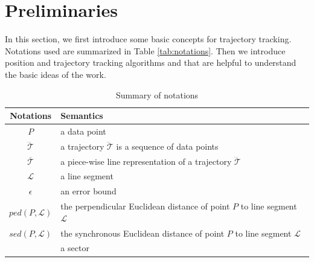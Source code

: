 



\section{Preliminaries}
\label{sec-pre}

In this section, we first introduce some basic concepts for trajectory tracking.
Notations used are summarized in Table \ref{tab:notations}.
Then we introduce position and trajectory tracking algorithms \ldr and \ldrh that are helpful to understand the basic ideas of the work.

\begin{table}
	\renewcommand{\arraystretch}{1.20}
	\caption{\small Summary of notations}
	\vspace{-1.5ex}
	\centering
	\footnotesize
	\begin{tabular}{|c|l|}
		\hline
		{\bf Notations}& {\bf Semantics}   \\		\hline %
		$P$ & a data point \\		\hline
		$\dddot{\mathcal{T}}$ & a trajectory $\dddot{\mathcal{T}}$ is a sequence of data points\\		\hline
		$\overline{\mathcal{T}}$&  {a piece-wise line representation of a trajectory $\dddot{\mathcal{T}}$}	\\		\hline
		$\mathcal{L}$ & a line segment  \\		\hline
		$\epsilon$ & an error bound \\		\hline
		$ped\left(P, \mathcal{L}\right)$ &  {the perpendicular Euclidean distance of point $P$ to line segment $\mathcal{L}$}	\\	\hline
		$sed\left(P, \mathcal{L}\right)$ & {the synchronous Euclidean distance of point $P$ to line segment $\mathcal{L}$} 	\\		\hline
		\sector{} & a sector \\		\hline

\end{tabular}
\end{table}
